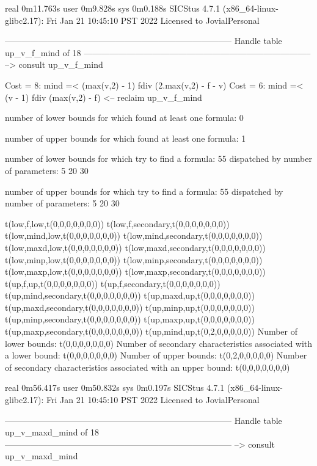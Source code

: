 real	0m11.763s
user	0m9.828s
sys	0m0.188s
SICStus 4.7.1 (x86_64-linux-glibc2.17): Fri Jan 21 10:45:10 PST 2022
Licensed to JovialPersonal


--------------------------------------------------------------------------------
Handle table up_v_f_mind of 18
--------------------------------------------------------------------------------
--> consult up_v_f_mind

Cost =  8:  mind =< (max(v,2) - 1) fdiv (2.max(v,2) - f - v)
Cost =  6:  mind =< (v - 1) fdiv (max(v,2) - f)
<-- reclaim up_v_f_mind

number of lower bounds for which found at least one formula: 0

number of upper bounds for which found at least one formula: 1

number of lower bounds for which try to find a formula: 55
dispatched by number of parameters: 5  20  30

number of upper bounds for which try to find a formula: 55
dispatched by number of parameters: 5  20  30

t(low,f,low,t(0,0,0,0,0,0,0))
t(low,f,secondary,t(0,0,0,0,0,0,0))
t(low,mind,low,t(0,0,0,0,0,0,0))
t(low,mind,secondary,t(0,0,0,0,0,0,0))
t(low,maxd,low,t(0,0,0,0,0,0,0))
t(low,maxd,secondary,t(0,0,0,0,0,0,0))
t(low,minp,low,t(0,0,0,0,0,0,0))
t(low,minp,secondary,t(0,0,0,0,0,0,0))
t(low,maxp,low,t(0,0,0,0,0,0,0))
t(low,maxp,secondary,t(0,0,0,0,0,0,0))
t(up,f,up,t(0,0,0,0,0,0,0))
t(up,f,secondary,t(0,0,0,0,0,0,0))
t(up,mind,secondary,t(0,0,0,0,0,0,0))
t(up,maxd,up,t(0,0,0,0,0,0,0))
t(up,maxd,secondary,t(0,0,0,0,0,0,0))
t(up,minp,up,t(0,0,0,0,0,0,0))
t(up,minp,secondary,t(0,0,0,0,0,0,0))
t(up,maxp,up,t(0,0,0,0,0,0,0))
t(up,maxp,secondary,t(0,0,0,0,0,0,0))
t(up,mind,up,t(0,2,0,0,0,0,0))
Number of lower bounds:                                             t(0,0,0,0,0,0,0)
Number of secondary characteristics associated with a lower bound:  t(0,0,0,0,0,0,0)
Number of upper bounds:                                             t(0,2,0,0,0,0,0)
Number of secondary characteristics associated with an upper bound: t(0,0,0,0,0,0,0)

real	0m56.417s
user	0m50.832s
sys	0m0.197s
SICStus 4.7.1 (x86_64-linux-glibc2.17): Fri Jan 21 10:45:10 PST 2022
Licensed to JovialPersonal


--------------------------------------------------------------------------------
Handle table up_v_maxd_mind of 18
--------------------------------------------------------------------------------
--> consult up_v_maxd_mind

